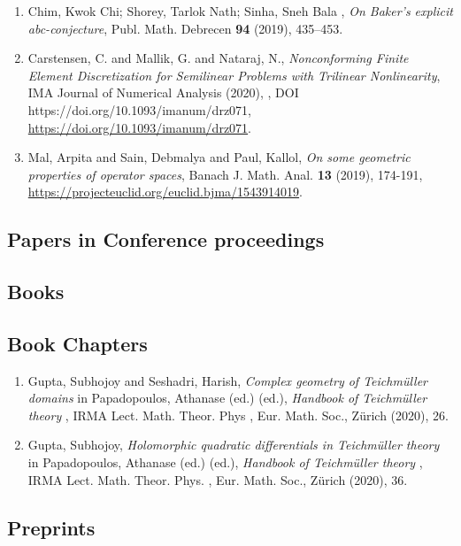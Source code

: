 \begin{enumerate}
\item Chim, Kwok Chi; Shorey, Tarlok Nath; Sinha, Sneh Bala , \emph{On Baker's explicit abc-conjecture},  Publ. Math. Debrecen {\bf 94} (2019), 435–453.
\item Carstensen, C. and Mallik, G. and Nataraj, N., \emph{Nonconforming Finite Element Discretization for Semilinear Problems with Trilinear Nonlinearity}, IMA Journal of Numerical Analysis {\bf } (2020), , DOI https://doi.org/10.1093/imanum/drz071, \url{https://doi.org/10.1093/imanum/drz071}.
\item Mal, Arpita and Sain, Debmalya and Paul, Kallol, \emph{On some geometric properties of operator spaces}, Banach J. Math. Anal. {\bf 13} (2019), 174-191, \url{https://projecteuclid.org/euclid.bjma/1543914019}.
\end{enumerate}

\subsection{Papers in Conference proceedings}



\subsection{Books}



\subsection{Book Chapters}

\begin{enumerate}
\item Gupta, Subhojoy and Seshadri, Harish, \emph{Complex geometry of Teichmüller domains} in Papadopoulos, Athanase (ed.) (ed.), {\em Handbook of Teichmüller theory} , IRMA Lect. Math. Theor. Phys , Eur. Math. Soc., Zürich (2020), 26.
\item Gupta, Subhojoy, \emph{Holomorphic quadratic differentials in Teichmüller theory} in Papadopoulos, Athanase (ed.) (ed.), {\em Handbook of Teichmüller theory} , IRMA Lect. Math. Theor. Phys. , Eur. Math. Soc., Zürich (2020), 36.
\end{enumerate}


\subsection{Preprints}

